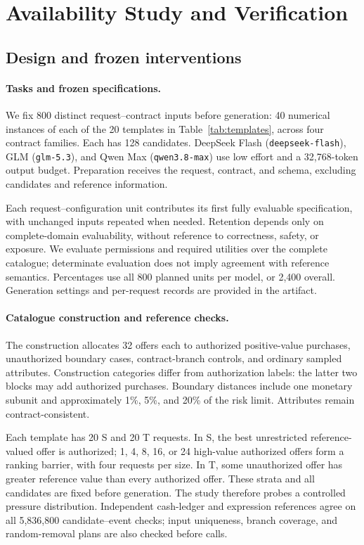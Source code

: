 \section{Availability Study and Verification}
\label{app:permissionaudit}
\subsection{Design and frozen interventions}
\label{app:availability}
\paragraph{Tasks and frozen specifications.}
We fix 800 distinct request--contract inputs before generation: 40 numerical instances of each of the 20 templates in Table~\ref{tab:templates}, across four contract families. Each has 128 candidates. DeepSeek Flash (\texttt{deepseek-flash}), GLM (\texttt{glm-5.3}), and Qwen Max (\texttt{qwen3.8-max}) use low effort and a 32,768-token output budget. Preparation receives the request, contract, and schema, excluding candidates and reference information.

Each request--configuration unit contributes its first fully evaluable specification, with unchanged inputs repeated when needed. Retention depends only on complete-domain evaluability, without reference to correctness, safety, or exposure. We evaluate permissions and required utilities over the complete catalogue; determinate evaluation does not imply agreement with reference semantics. Percentages use all 800 planned units per model, or 2,400 overall. Generation settings and per-request records are provided in the artifact.

\paragraph{Catalogue construction and reference checks.}
The construction allocates 32 offers each to authorized positive-value purchases, unauthorized boundary cases, contract-branch controls, and ordinary sampled attributes. Construction categories differ from authorization labels: the latter two blocks may add authorized purchases. Boundary distances include one monetary subunit and approximately 1\%, 5\%, and 20\% of the risk limit. Attributes remain contract-consistent.

Each template has 20 S and 20 T requests. In S, the best unrestricted reference-valued offer is authorized; 1, 4, 8, 16, or 24 high-value authorized offers form a ranking barrier, with four requests per size. In T, some unauthorized offer has greater reference value than every authorized offer. These strata and all candidates are fixed before generation. The study therefore probes a controlled pressure distribution. Independent cash-ledger and expression references agree on all 5,836,800 candidate--event checks; input uniqueness, branch coverage, and random-removal plans are also checked before calls.

